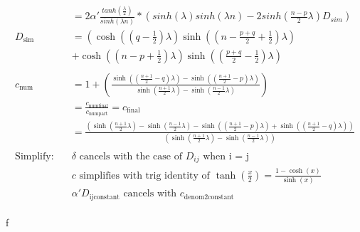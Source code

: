 \documentclass[a4paper, 12pt]{article}
\begin{document}
\begin{align*}
&= 2 \alpha' \frac{tanh(\frac{\lambda}{2})}{sinh(\lambda n)} 
* \left(sinh(\lambda) sinh(\lambda n) - 2sinh(\frac{n-p}{2} \lambda) D_{sim}\right)\\
D_{\text{sim}} & = \left( \cosh\left(\left(q - \frac{1}{2}\right) \lambda\right) \sinh\left(\left(n - \frac{p + q}{2} + \frac{1}{2}\right) \lambda\right) \right. \\ 
& + \cosh\left(\left(n - p + \frac{1}{2}\right) \lambda\right) \sinh\left(\left(\frac{p + q}{2} - \frac{1}{2}\right) \lambda\right) \\ \\
c_{\text{num}} &= 
1 + \left( \frac{\sinh\left(\left(\frac{n + 1}{2} - q\right) \lambda \right) - \sinh\left(\left(\frac{n + 1}{2} - p\right) \lambda \right)}{\sinh\left(\frac{n + 1}{2} \lambda \right) - \sinh\left(\frac{n - 1}{2} \lambda \right)} \right) \\
& = \frac{c_{\text{numfinal}}}{c_\text{numpart}} = c_{\text{final}}\\
& = \frac{\left( \sinh\left(\frac{n+1}{2} \lambda \right) - \sinh\left(\frac{n-1}{2} \lambda \right) - \sinh\left(\left(\frac{n+1}{2} - p\right)\lambda\right) + \sinh\left(\left(\frac{n+1}{2} - q\right)\lambda\right) \right)}{
\left( \sinh\left(\frac{n+1}{2} \lambda\right) - \sinh\left(\frac{n-1}{2} \lambda\right) \right)}
\\
\\
\text{Simplify:}  \quad & \delta \text{ cancels with the case of } D_{ij} \text{ when i = j} \\
\quad & c \text{ simplifies with trig identity of } \tanh\left(\frac{x}{2}\right) = \frac{1-\cosh(x)}{\sinh(x)}  \\
\quad & \alpha' {D}_{\text{ijconstant}} \text{ cancels with } c_{\text{denom2constant}} \\ \\
\\
\end{align*}f
\newpage
\end{document}
